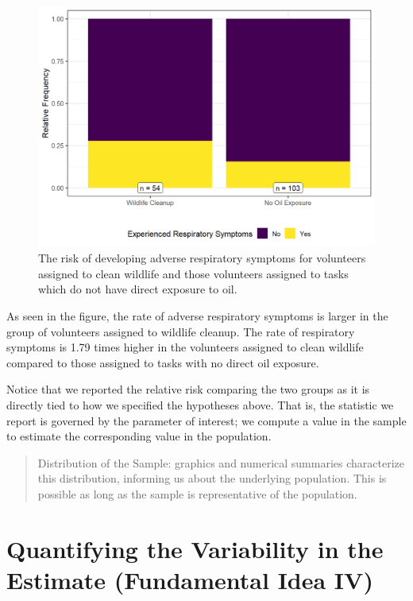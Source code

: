 \documentclass[
]{book}
\theoremstyle{plain}
\theoremstyle{mydefn}
\theoremstyle{myexmpl}
\theoremstyle{remark}
\begin{document}
\begin{figure}

{\centering \includegraphics[width=0.8\linewidth]{./Images/recaplanguage-deepwater-plot-1} 

}

\caption{The risk of developing adverse respiratory symptoms for volunteers assigned to clean wildlife and those volunteers assigned to tasks which do not have direct exposure to oil.}\label{fig:recaplanguage-deepwater-plot}
\end{figure}

As seen in the figure, the rate of adverse respiratory symptoms is larger in the group of volunteers assigned to wildlife cleanup. The rate of respiratory symptoms is 1.79 times higher in the volunteers assigned to clean wildlife compared to those assigned to tasks with no direct oil exposure.

Notice that we reported the relative risk comparing the two groups as it is directly tied to how we specified the hypotheses above. That is, the statistic we report is governed by the parameter of interest; we compute a value in the sample to estimate the corresponding value in the population.

\begin{quote}
Distribution of the Sample: graphics and numerical summaries characterize this distribution, informing us about the underlying population. This is possible as long as the sample is representative of the population.
\end{quote}

\hypertarget{quantifying-the-variability-in-the-estimate-fundamental-idea-iv}{%
\section{Quantifying the Variability in the Estimate (Fundamental Idea IV)}\label{quantifying-the-variability-in-the-estimate-fundamental-idea-iv}}
\end{document}
